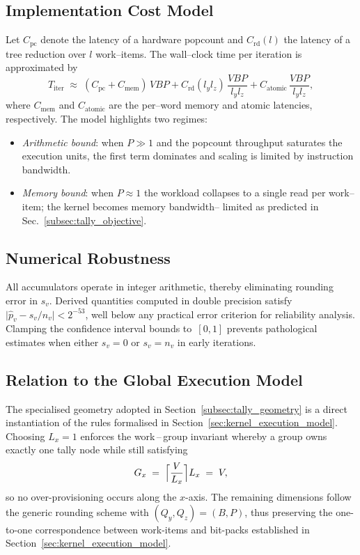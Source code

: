\subsection{Implementation Cost Model}
\label{subsec:tally_cost_model}

Let \(C_{\mathrm{pc}}\) denote the latency of a hardware popcount and
\(C_{\mathrm{rd}}(l)\) the latency of a tree reduction over \(l\) work--items.
The wall--clock time per iteration is approximated by
\[
  T_{\text{iter}} \;\approx\;
  (C_{\mathrm{pc}} + C_{\mathrm{mem}})\,VBP +
  C_{\mathrm{rd}}(l_y l_z)\,\frac{VBP}{l_y l_z}
  + C_{\mathrm{atomic}}\,\frac{VBP}{l_y l_z},
\]
where \(C_{\mathrm{mem}}\) and \(C_{\mathrm{atomic}}\) are the per--word memory
and atomic latencies, respectively.  The model highlights two regimes:
\begin{itemize}
  \item\emph{Arithmetic bound}: when \(P\gg 1\) and the popcount throughput
        saturates the execution units, the first term dominates and scaling is
        limited by instruction bandwidth.
  \item\emph{Memory bound}: when \(P\approx 1\) the workload collapses to a
        single read per work--item; the kernel becomes memory bandwidth--
        limited as predicted in Sec.~\ref{subsec:tally_objective}.
\end{itemize}


\subsection{Numerical Robustness}
\label{subsec:tally_numerics}

All accumulators operate in integer arithmetic, thereby eliminating rounding
error in \(s_v\).  Derived quantities computed in double precision satisfy
\(\lvert\widehat{p}_v - s_v/n_v\rvert < 2^{-53}\), well below any practical
error criterion for reliability analysis.  Clamping the confidence interval
bounds to~\([0,1]\) prevents pathological estimates when either \(s_v=0\) or
\(s_v=n_v\) in early iterations.

\subsection{Relation to the Global Execution Model}
\label{subsec:tally_exec_relation}

The specialised geometry adopted in Section~\ref{subsec:tally_geometry} is a direct instantiation of the rules formalised in Section~\ref{sec:kernel_execution_model}.  Choosing $L_x=1$ enforces the work\,–\,group invariant whereby a group owns exactly one tally node while still satisfying
\[
   G_x \;=\; \Bigl\lceil \frac{V}{L_x} \Bigr\rceil L_x \;=\; V ,
\]
so no over-provisioning occurs along the $x$-axis.  The remaining dimensions follow the generic rounding scheme with $(Q_y,Q_z)=(B,P)$, thus preserving the one-to-one correspondence between work-items and bit-packs established in Section~\ref{sec:kernel_execution_model}.